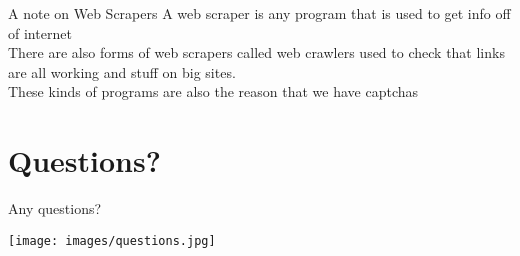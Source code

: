 \documentclass{beamer}
\begin{document}
		\begin{frame}{A note on Web Scrapers}
			A web scraper is any program that is used to get info off of internet\\
			There are also forms of web scrapers called web crawlers used to check that links are all working and stuff on big sites. \\
			These kinds of programs are also the reason that we have captchas
		\end{frame}
	
	\section{Questions?}
		\begin{frame}{Any questions?}
			\begin{center}
				\texttt{[image: images/questions.jpg]}
			\end{center}
		\end{frame}

	
\end{document}
